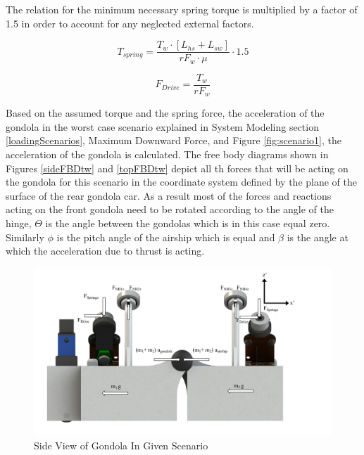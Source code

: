 \documentclass[../main.tex]{subfiles}
\begin{document}
The relation for the minimum necessary spring torque is multiplied by a factor of 1.5 in order to account for any neglected external factors.

\begin{equation}
\label{eqn:springTorque}
T_{spring} = \frac{T_w\cdot{}[L_{hs}+L_{sw}]}{r{F_w}\cdot{}\mu}\cdot{}1.5
\end{equation}

\begin{equation}
\label{eqn:driveForce}
F_{Drive} = \frac{T_w}{r{F_w}}
\end{equation}

Based on the assumed torque and the spring force, the acceleration of the gondola in the worst case scenario explained in System Modeling section \ref{loadingScenarios}, Maximum Downward Force, and Figure \ref{fig:scenario1}, the acceleration of the gondola is calculated. The free body diagrams shown in Figures \ref{sideFBDtw} and \ref{topFBDtw} depict all th forces that will be acting on the gondola for this scenario in the coordinate system defined by the plane of the surface of the rear gondola car. As a result most of the forces and reactions acting on the front gondola need to be rotated according to the angle of the hinge, $\Theta$ is the angle between the gondolas which is in this case equal zero. Similarly $\phi$ is the pitch angle of the airship which is equal  and $\beta$ is the angle at which the acceleration due to thrust is acting. 
\begin{figure}[H]
	\centering
	\includegraphics[width=1.1\linewidth]{img/gondola/gondolaSideTW.pdf}
	\caption{Side View of Gondola In Given Scenario}
	\label{fig:gondolaSideTW}
\end{figure}
\end{document}
